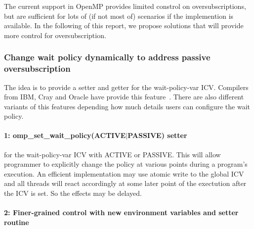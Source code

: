 
The current support in OpenMP provides limited constrol on oversubscriptions, but are sufficient 
for lots of (if not most of) scenarios if the implemention is available. In the following of this
report, we propose solutions that will provide more
control for oversubscription.
\subsubsection{Change wait policy dynamically to address passive oversubscription}
The idea is to provide a setter and getter for the wait-policy-var
ICV. Compilers from IBM, Cray and Oracle have provide this feature~\cite{ibmwait,craywait,oraclewait}.
There are also different variants of this features depending how much details users can configure
the wait policy.
\paragraph{1: {\sf omp\_set\_wait\_policy(ACTIVE$\vert$PASSIVE)} setter} for the wait-policy-var
ICV with ACTIVE or PASSIVE. This will allow programmer to explicitly change the policy at various 
points during a program's execution. An efficient implementation may use atomic write to the 
global ICV and all threads will react accordingly at some later point of the exectution after the 
ICV is set. So the effects may be delayed.

\paragraph{2: Finer-grained control with new environment variables and setter routine}



